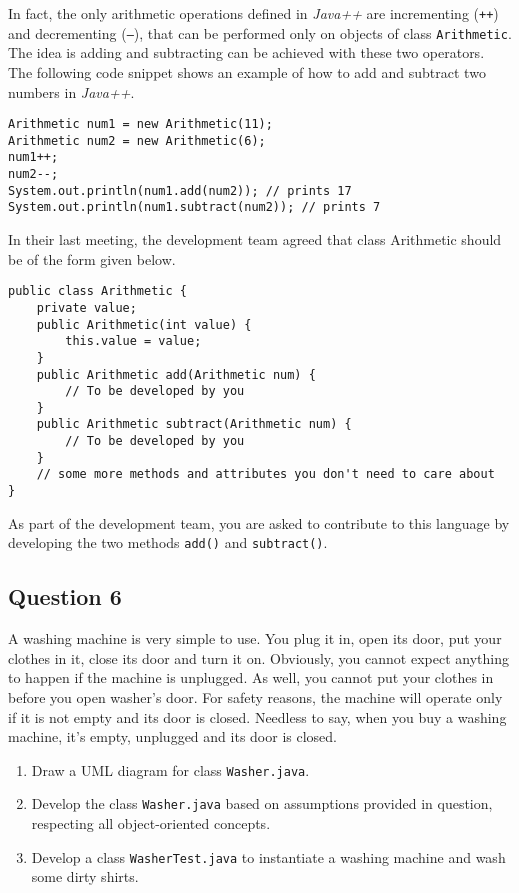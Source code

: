 In fact, the only arithmetic operations defined in \textit{Java++} are incrementing (\texttt{++}) and decrementing (\texttt{--}), that can be performed only on objects of class \texttt{Arithmetic}. The idea is adding and subtracting can be achieved with these two operators. The following code snippet shows an example of how to add and subtract two numbers in \textit{Java++}.

\begin{lstlisting}
Arithmetic num1 = new Arithmetic(11);
Arithmetic num2 = new Arithmetic(6);
num1++;
num2--;
System.out.println(num1.add(num2)); // prints 17
System.out.println(num1.subtract(num2)); // prints 7
\end{lstlisting}

In their last meeting, the development team agreed that class Arithmetic should be of the form given below.

\begin{lstlisting}
public class Arithmetic {
	private value;
	public Arithmetic(int value) {
		this.value = value;
	}
	public Arithmetic add(Arithmetic num) {
		// To be developed by you
	}
	public Arithmetic subtract(Arithmetic num) {
		// To be developed by you
	}
	// some more methods and attributes you don't need to care about
}
\end{lstlisting}

As part of the development team, you are asked to contribute to this language by developing the two methods \texttt{add()} and \texttt{subtract()}.
\newpage
\subsection*{Question 6}

A washing machine is very simple to use. You plug it in, open its door, put your clothes in it, close its door and turn it on. Obviously, you cannot expect anything to happen if the machine is unplugged. As well, you cannot put your clothes in before you open washer's door. For safety reasons, the machine will operate only if it is not empty and its door is closed. Needless to say, when you buy a washing machine, it's empty, unplugged and its door is closed.

\begin{enumerate}[label=(\alph*)]\itemsep=0pt
\item Draw a UML diagram for class \texttt{Washer.java}.
\item Develop the class \texttt{Washer.java} based on assumptions provided in question, respecting all object-oriented concepts.
\item Develop a class \texttt{WasherTest.java} to instantiate a washing machine and wash some dirty shirts.
\end{enumerate}
